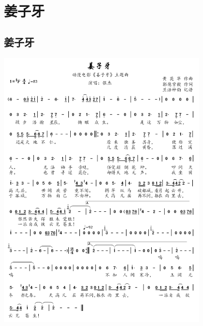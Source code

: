 \documentclass[cn,pad,twocol]{elegantbook}
\begin{document}
\chapter{姜子牙}
\section{姜子牙} \includegraphics[width=0.8\textwidth]{rpi400/20210206姜子牙主题曲.png}
\end{document}

